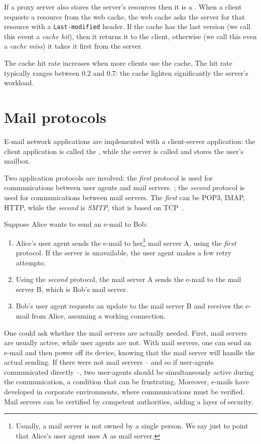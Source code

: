 If a proxy server also stores the server's resources then it is a . 
When a client requests a resource from the web cache, the web cache asks the server for that resource with a \texttt{Last-modified} header.
If the cache has the last version (we call this event a \emph{cache hit}), then it returns it to the client, otherwise (we call this even a \emph{cache miss}) it takes it first from the server.

The cache hit rate increases when more clients use the cache. The hit rate typically ranges between 0.2 and 0.7: the cache lighten significantly the server's workload.

\section{Mail protocols}
E-mail network applications are implemented with a client-server application: the client application is called the , while the server is called  and stores the user's mailbox.

Two application protocols are involved: the \emph{first} protocol is used for communications between user agents and mail servers. ; the \emph{second} protocol is used for communications between mail servers.
The \emph{first} can be POP3, IMAP, HTTP, while the \emph{second} is \emph{SMTP}, that is based on TCP~\cite{kurose2017}.

Suppose Alice wants to send an e-mail to Bob: 
\begin{enumerate}
    \item Alice's user agent sends the e-mail to her\footnote{Usually, a mail server is not owned by a single person. We say  just to point that Alice's user agent uses A as mail server.} mail server A, using the \emph{first} protocol. If the server is unavailable, the user agent makes a few retry attempts;
    \item Using the \emph{second} protocol, the mail server A sends the e-mail to the mail server B, which is Bob's mail server.
    \item Bob's user agent requests an update to the mail server B and receives the e-mail from Alice, assuming a working connection.
\end{enumerate}

One could ask whether the mail servers are actually needed. First, mail servers are usually active, while user agents are not. With mail servers, one can send an e-mail and then power off its device, knowing that the mail server will handle the actual sending. If there were not mail servers -- and so if user-agents communicated directly --, two user-agents should be simultaneously active during the communication, a condition that can be frustrating.
Moreover, e-mails have developed in corporate environments, where communications must be verified. Mail servers can be certified by competent authorities, adding a layer of security.


